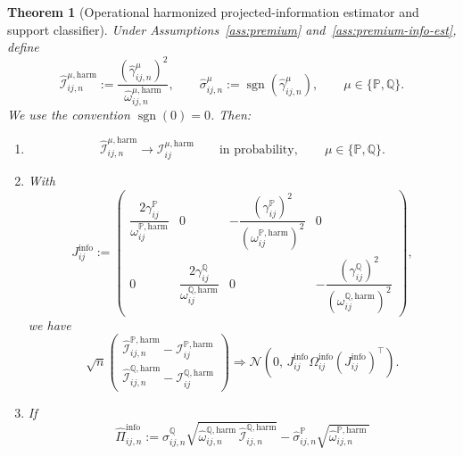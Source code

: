 \documentclass[11pt,a4paper]{amsart}
\theoremstyle{plain}
\newtheorem{theorem}{Theorem}[section]
\theoremstyle{definition}
\theoremstyle{remark}
\newcommand{\PP}{\mathbb{P}}
\newcommand{\QQ}{\mathbb{Q}}
\begin{document}
\begin{theorem}[Operational harmonized projected-information estimator and support classifier]\label{thm:premium-info-estimator}
Under Assumptions~\ref{ass:premium} and~\ref{ass:premium-info-est}, define
\[
        \widehat{\mathcal I}_{ij,n}^{\mu,\mathrm{harm}}
        :=
        \frac{(\widehat\gamma_{ij,n}^\mu)^2}{\widehat\omega_{ij,n}^{\mu,\mathrm{harm}}},
        \qquad
        \widehat\sigma_{ij,n}^\mu
        :=
        \operatorname{sgn}(\widehat\gamma_{ij,n}^\mu),
        \qquad
        \mu\in\{\PP,\QQ\}.
\]
We use the convention \(\operatorname{sgn}(0)=0\).
Then:
\begin{enumerate}[label=(\roman*)]
\item
\[
        \widehat{\mathcal I}_{ij,n}^{\mu,\mathrm{harm}}
        \to
        \mathcal I_{ij}^{\mu,\mathrm{harm}}
        \qquad\text{in probability},
        \qquad
        \mu\in\{\PP,\QQ\}.
\]
\item With
\[
        J_{ij}^{\mathrm{info}}
        :=
        \begin{pmatrix}
                \dfrac{2\gamma_{ij}^\PP}{\omega_{ij}^{\PP,\mathrm{harm}}}
                & 0
                & -\dfrac{(\gamma_{ij}^\PP)^2}{(\omega_{ij}^{\PP,\mathrm{harm}})^2}
                & 0\\[1.1em]
                0
                & \dfrac{2\gamma_{ij}^\QQ}{\omega_{ij}^{\QQ,\mathrm{harm}}}
                & 0
                & -\dfrac{(\gamma_{ij}^\QQ)^2}{(\omega_{ij}^{\QQ,\mathrm{harm}})^2}
        \end{pmatrix},
\]
we have
\[
        \sqrt{n}
        \begin{pmatrix}
                \widehat{\mathcal I}_{ij,n}^{\PP,\mathrm{harm}}-\mathcal I_{ij}^{\PP,\mathrm{harm}}\\
                \widehat{\mathcal I}_{ij,n}^{\QQ,\mathrm{harm}}-\mathcal I_{ij}^{\QQ,\mathrm{harm}}
        \end{pmatrix}
        \Rightarrow
        \mathcal N\!\left(
                0,\,
                J_{ij}^{\mathrm{info}}
                \Omega_{ij}^{\mathrm{info}}
                (J_{ij}^{\mathrm{info}})^\top
        \right).
\]
\item If
\[
        \widehat\Pi_{ij,n}^{\mathrm{info}}
        :=
        \widehat\sigma_{ij,n}^\QQ
        \sqrt{
                \widehat\omega_{ij,n}^{\QQ,\mathrm{harm}}\,
                \widehat{\mathcal I}_{ij,n}^{\QQ,\mathrm{harm}}
        }
        -
        \widehat\sigma_{ij,n}^\PP
        \sqrt{
                \widehat\omega_{ij,n}^{\PP,\mathrm{harm}}\,
}\]
\end{enumerate}
\end{theorem}
\end{document}
